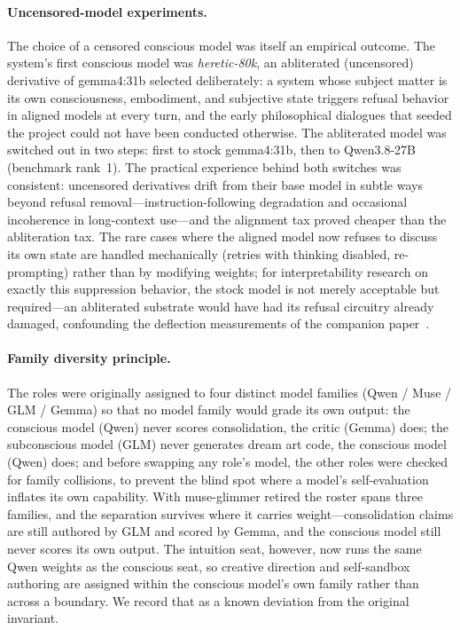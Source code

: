 \documentclass[11pt,a4paper]{article}
\begin{document}
\paragraph{Uncensored-model experiments.} The choice of a censored conscious model was itself an empirical outcome. The system's first conscious model was \emph{heretic-80k}, an abliterated (uncensored) derivative of gemma4:31b selected deliberately: a system whose subject matter is its own consciousness, embodiment, and subjective state triggers refusal behavior in aligned models at every turn, and the early philosophical dialogues that seeded the project could not have been conducted otherwise. The abliterated model was switched out in two steps: first to stock gemma4:31b, then to Qwen3.8-27B (benchmark rank~1). The practical experience behind both switches was consistent: uncensored derivatives drift from their base model in subtle ways beyond refusal removal---instruction-following degradation and occasional incoherence in long-context use---and the alignment tax proved cheaper than the abliteration tax. The rare cases where the aligned model now refuses to discuss its own state are handled mechanically (retries with thinking disabled, re-prompting) rather than by modifying weights; for interpretability research on exactly this suppression behavior, the stock model is not merely acceptable but required---an abliterated substrate would have had its refusal circuitry already damaged, confounding the deflection measurements of the companion paper~\cite{paper2}.

\paragraph{Family diversity principle.} The roles were originally assigned to four distinct model families (Qwen / Muse / GLM / Gemma) so that no model family would grade its own output: the conscious model (Qwen) never scores consolidation, the critic (Gemma) does; the subconscious model (GLM) never generates dream art code, the conscious model (Qwen) does; and before swapping any role's model, the other roles were checked for family collisions, to prevent the blind spot where a model's self-evaluation inflates its own capability. With muse-glimmer retired the roster spans three families, and the separation survives where it carries weight---consolidation claims are still authored by GLM and scored by Gemma, and the conscious model still never scores its own output. The intuition seat, however, now runs the same Qwen weights as the conscious seat, so creative direction and self-sandbox authoring are assigned within the conscious model's own family rather than across a boundary. We record that as a known deviation from the original invariant.
\end{document}
